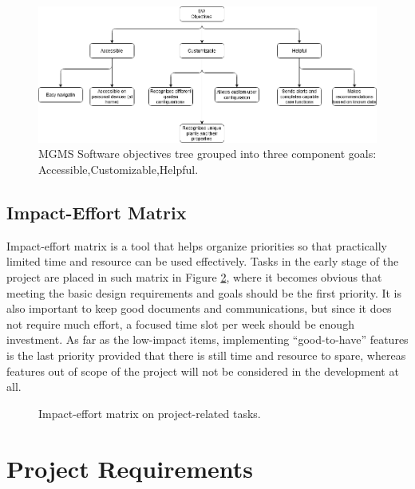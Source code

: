 \documentclass{report}
\begin{document}
\begin{figure}[H]
    \centering
    \includegraphics[width=\linewidth]{PNGs/SW_Objective_Tree.PNG}
    \caption{MGMS Software objectives tree grouped into three component goals: Accessible,Customizable,Helpful.}
    \label{fig:sw_obj}
\end{figure}

\section{Impact-Effort Matrix}
Impact-effort matrix is a tool that helps organize priorities so that practically limited time and resource can be used effectively. Tasks in the early stage of the project are placed in such matrix in Figure \ref{fig:impact_effort}, where it becomes obvious that meeting the basic design requirements and goals should be the first priority. It is also important to keep good documents and communications, but since it does not require much effort, a focused time slot per week should be enough investment. As far as the low-impact items, implementing ``good-to-have'' features is the last priority provided that there is still time and resource to spare, whereas features out of scope of the project will not be considered in the development at all.

\vspace{15pt}
\begin{figure}[H]
    \centering
    \begin{minipage}{0.9\linewidth}
        
        \caption{Impact-effort matrix on project-related tasks.}
        \label{fig:impact_effort}
    \end{minipage}
\end{figure}

\chapter{Project Requirements}
\end{document}
